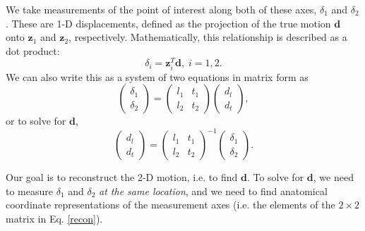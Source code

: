 \documentclass[preprint,NumberedRefs]{JASA}
\begin{document}
\par{We take measurements of the point of interest along both of these axes, $\delta_1$ and $\delta_2$. These are 1-D displacements, defined as the projection of the true motion $\mathbf{d}$ onto $\mathbf{z}_1$ and $\mathbf{z}_2$, respectively. Mathematically, this relationship is described as a dot product: 
\begin{equation}
	\delta_i = \mathbf{z}_i^T\mathbf{d},\;i=1,2.
\end{equation}
We can also write this as a system of two equations in matrix form as
\renewcommand*{\arraystretch}{.5}
\begin{equation}
	\begin{pmatrix}\delta_1\\ \delta_2\end{pmatrix} = \begin{pmatrix}l_1&t_1\\l_2&t_2\end{pmatrix}\begin{pmatrix}d_l\\d_t\end{pmatrix},
\end{equation}
or to solve for $\mathbf{d}$,
\renewcommand*{\arraystretch}{.5}
\begin{equation}
	\begin{pmatrix}d_l\\d_t\end{pmatrix}= \begin{pmatrix}l_1&t_1\\l_2&t_2\end{pmatrix}^{-1}\begin{pmatrix}\delta_1\\ \delta_2\end{pmatrix}.
		\label{recon}
\end{equation}
}
\par{Our goal is to reconstruct the 2-D motion, i.e. to find $\mathbf{d}$. To solve for $\mathbf{d}$, we need to measure $\delta_1$ and $\delta_2$ \textit{at the same location}, and we need to find anatomical coordinate representations of the measurement axes (i.e. the elements of the $2\times 2$ matrix in Eq. \ref{recon}).}
\end{document}
